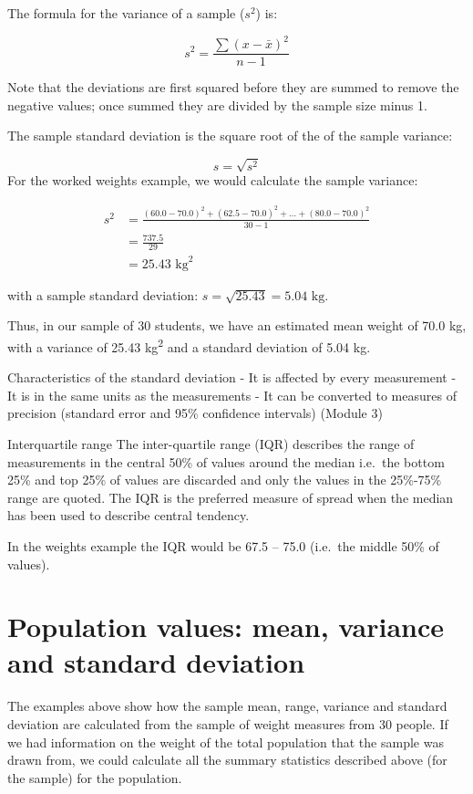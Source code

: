 \documentclass[
]{memoir}
\begin{document}
The formula for the variance of a sample (\(s^2\)) is:

\[ s^2 = \frac{\sum(x - \bar{x})^2}{n-1} \]

Note that the deviations are first squared before they are summed to remove the negative values; once summed they are divided by the sample size minus 1.

The sample standard deviation is the square root of the of the sample variance:

\[s = \sqrt{s^2}\]
For the worked weights example, we would calculate the sample variance:

\[\begin{aligned}
  s^2 &= \frac{(60.0 - 70.0)^2 + (62.5 - 70.0)^2 + \dots + (80.0 - 70.0)^2}{30-1} \\
      &= \frac{737.5}{29} \\
      &= 25.43 \text{ kg}^2
  \end{aligned}\]

with a sample standard deviation: \(s = \sqrt{25.43} = 5.04 \text{ kg}\).

Thus, in our sample of 30 students, we have an estimated mean weight of 70.0 kg, with a variance of 25.43 kg\textsuperscript{2} and a standard deviation of 5.04 kg.

Characteristics of the standard deviation
- It is affected by every measurement
- It is in the same units as the measurements
- It can be converted to measures of precision (standard error and 95\% confidence intervals) (Module 3)

Interquartile range
The inter-quartile range (IQR) describes the range of measurements in the central 50\% of values around the median i.e.~the bottom 25\% and top 25\% of values are discarded and only the values in the 25\%-75\% range are quoted. The IQR is the preferred measure of spread when the median has been used to describe central tendency.

In the weights example the IQR would be 67.5 -- 75.0 (i.e.~the middle 50\% of values).

\hypertarget{population-values-mean-variance-and-standard-deviation}{%
\section{Population values: mean, variance and standard deviation}\label{population-values-mean-variance-and-standard-deviation}}

The examples above show how the sample mean, range, variance and standard deviation are calculated from the sample of weight measures from 30 people. If we had information on the weight of the total population that the sample was drawn from, we could calculate all the summary statistics described above (for the sample) for the population.
\end{document}
